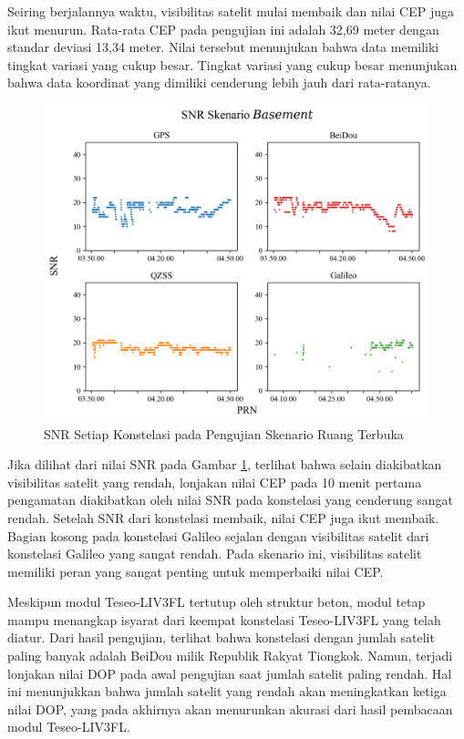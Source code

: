 Seiring berjalannya waktu, visibilitas satelit mulai membaik dan nilai CEP juga ikut menurun. Rata-rata CEP pada pengujian ini adalah 32,69 meter dengan standar deviasi 13,34 meter. Nilai tersebut menunjukan bahwa data memiliki tingkat variasi yang cukup besar. Tingkat variasi yang cukup besar menunjukan bahwa data koordinat yang dimiliki cenderung lebih jauh dari rata-ratanya.

\begin{figure}[H]
	\centering
	\includegraphics[width=13cm]{contents/chapter-4/1-skenario-basement/snr.png}
	\caption{SNR Setiap Konstelasi pada Pengujian Skenario Ruang Terbuka}
	\label{Fig: basement-snr}
\end{figure}

Jika dilihat dari nilai SNR pada Gambar \ref{Fig: basement-snr}, terlihat bahwa selain diakibatkan visibilitas satelit yang rendah, lonjakan nilai CEP pada 10 menit pertama pengamatan diakibatkan oleh nilai SNR pada konstelasi yang cenderung sangat rendah. Setelah SNR dari konstelasi membaik, nilai CEP juga ikut membaik. Bagian kosong pada konstelasi Galileo sejalan dengan visibilitas satelit dari konstelasi Galileo yang sangat rendah. Pada skenario ini, visibilitas satelit memiliki peran yang sangat penting untuk memperbaiki nilai CEP.

Meskipun modul Teseo\hyp{}LIV3FL tertutup oleh struktur beton, modul tetap mampu menangkap isyarat dari keempat konstelasi Teseo\hyp{}LIV3FL yang telah diatur. Dari hasil pengujian, terlihat bahwa konstelasi dengan jumlah satelit paling banyak adalah BeiDou milik Republik Rakyat Tiongkok. Namun, terjadi lonjakan nilai DOP pada awal pengujian saat jumlah satelit paling rendah. Hal ini menunjukkan bahwa jumlah satelit yang rendah akan meningkatkan ketiga nilai DOP, yang pada akhirnya akan menurunkan akurasi dari hasil pembacaan modul Teseo\hyp{}LIV3FL.

